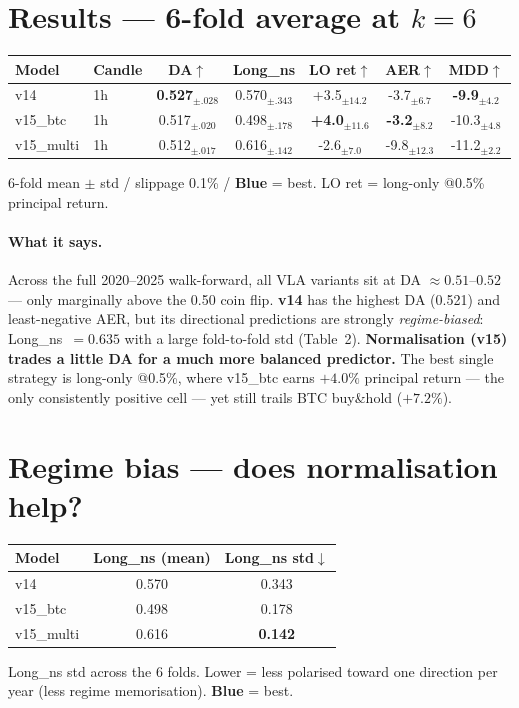 \documentclass[11pt]{article}
\newcommand{\bb}[1]{\textcolor{best}{\textbf{#1}}}
\begin{document}
\section*{Results --- 6-fold average at $k{=}6$}
\begin{table}[h]\centering
\begin{tabular}{llccccc}
\toprule
\textbf{Model} & \textbf{Candle} & \textbf{DA}$\uparrow$ & \textbf{Long\_ns} & \textbf{LO ret}$\uparrow$ & \textbf{AER}$\uparrow$ & \textbf{MDD}$\uparrow$ \\
\midrule
v14 & 1h & \bb{0.527$_{\pm.028}$} & 0.570$_{\pm.343}$ & +3.5$_{\pm14.2}$ & -3.7$_{\pm6.7}$ & \bb{-9.9$_{\pm4.2}$} \\
v15\_btc & 1h & 0.517$_{\pm.020}$ & 0.498$_{\pm.178}$ & \bb{+4.0$_{\pm11.6}$} & \bb{-3.2$_{\pm8.2}$} & -10.3$_{\pm4.8}$ \\
v15\_multi & 1h & 0.512$_{\pm.017}$ & 0.616$_{\pm.142}$ & -2.6$_{\pm7.0}$ & -9.8$_{\pm12.3}$ & -11.2$_{\pm2.2}$ \\
\bottomrule\end{tabular}
\par\smallskip\footnotesize 6-fold mean $\pm$ std / slippage 0.1\% / \bb{Blue} = best. LO ret = long-only @0.5\% principal return.
\end{table}
\paragraph{What it says.} Across the full 2020--2025 walk-forward, all VLA variants sit at DA $\approx 0.51$--$0.52$ --- only marginally above the 0.50 coin flip. \textbf{v14} has the highest DA (0.521) and least-negative AER, but its directional predictions are strongly \emph{regime-biased}: Long\_ns~$=0.635$ with a large fold-to-fold std (Table~2). \textbf{Normalisation (v15) trades a little DA for a much more balanced predictor.} The best single strategy is long-only @0.5\%, where v15\_btc earns $+4.0\%$ principal return --- the only consistently positive cell --- yet still trails BTC buy\&hold ($+7.2\%$).
\section*{Regime bias --- does normalisation help?}
\begin{table}[h]\centering
\begin{tabular}{lcc}
\toprule
\textbf{Model} & \textbf{Long\_ns (mean)} & \textbf{Long\_ns std}$\downarrow$ \\
\midrule
v14 & 0.570 & 0.343 \\
v15\_btc & 0.498 & 0.178 \\
v15\_multi & 0.616 & \bb{0.142} \\
\bottomrule\end{tabular}
\par\smallskip\footnotesize Long\_ns std across the 6 folds. Lower = less polarised toward one direction per year (less regime memorisation). \bb{Blue} = best.
\end{table}
\end{document}
